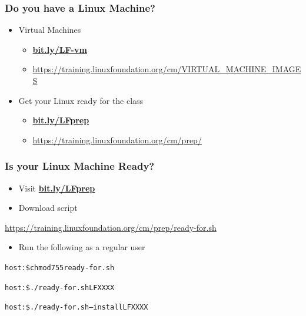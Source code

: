 \documentclass[bigger]{beamer}
\newcommand{\mycourse}{LFXXXX}
\begin{document}
\begin{frame}
	\frametitle{Do you have a Linux Machine?}
	\LARGE
	\begin{itemize} 
		\item Virtual Machines
		\begin{itemize} 
			\item {\Large\textbf{\url{bit.ly/LF-vm}}}
			\item {\small\url{https://training.linuxfoundation.org/cm/VIRTUAL_MACHINE_IMAGES}}
		\end{itemize}
		\vspace{0.5em}
		\item Get your Linux ready for the class
		\begin{itemize} 
			\item {\Large\textbf{\url{bit.ly/LFprep}}}
			\item {\small\url{https://training.linuxfoundation.org/cm/prep/}}
		\end{itemize}
	\end{itemize}
\end{frame}

\begin{frame}
	\frametitle{Is your Linux Machine Ready?}
	\LARGE
	\begin{itemize} 
		\item {\Large{}Visit \textbf{\url{bit.ly/LFprep}}}
		\vspace{0.5em}
		\item Download script
	\end{itemize}
	\vspace{-0.5em}
	{\footnotesize\url{https://training.linuxfoundation.org/cm/prep/ready-for.sh}}
	\vspace{0.5em}
	\begin{itemize} 
		\item Run the following as a regular user
	\end{itemize}
        \large
	\begin{alltt}
host:\$ chmod 755 ready-for.sh \par
host:\$ ./ready-for.sh \mycourse{} \par
host:\$ ./ready-for.sh –install \mycourse{}
	\end{alltt}
\end{frame}
\end{document}
